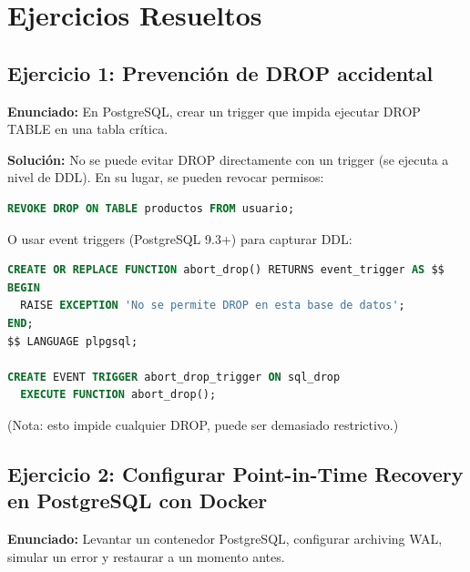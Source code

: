 \documentclass[12pt,a4paper,openany,oneside]{book}
\begin{document}
\chapter{Ejercicios Resueltos}
\section{Ejercicio 1: Prevención de DROP accidental}
\textbf{Enunciado:} En PostgreSQL, crear un trigger que impida ejecutar DROP TABLE en una tabla crítica.

\textbf{Solución:}
No se puede evitar DROP directamente con un trigger (se ejecuta a nivel de DDL). En su lugar, se pueden revocar permisos:
\begin{lstlisting}[language=SQL]
REVOKE DROP ON TABLE productos FROM usuario;
\end{lstlisting}
O usar event triggers (PostgreSQL 9.3+) para capturar DDL:
\begin{lstlisting}[language=SQL]
CREATE OR REPLACE FUNCTION abort_drop() RETURNS event_trigger AS $$
BEGIN
  RAISE EXCEPTION 'No se permite DROP en esta base de datos';
END;
$$ LANGUAGE plpgsql;

CREATE EVENT TRIGGER abort_drop_trigger ON sql_drop
  EXECUTE FUNCTION abort_drop();
\end{lstlisting}
(Nota: esto impide cualquier DROP, puede ser demasiado restrictivo.)

\section{Ejercicio 2: Configurar Point-in-Time Recovery en PostgreSQL con Docker}
\textbf{Enunciado:} Levantar un contenedor PostgreSQL, configurar archiving WAL, simular un error y restaurar a un momento antes.
\end{document}
